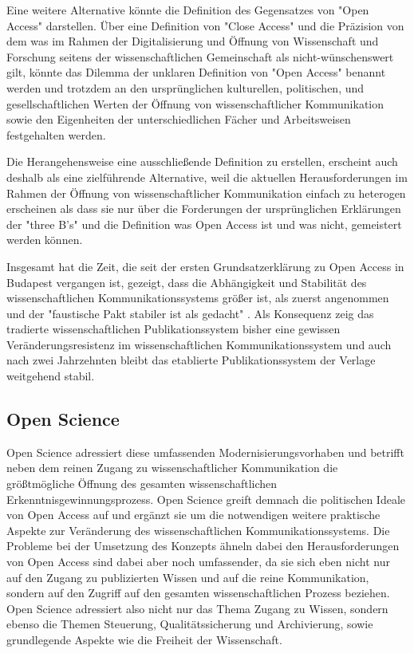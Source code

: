 Eine weitere Alternative könnte die Definition des Gegensatzes von "Open Access" darstellen. Über eine Definition von "Close Access" und die Präzision von dem was im Rahmen der Digitalisierung und Öffnung von Wissenschaft und Forschung seitens der wissenschaftlichen Gemeinschaft als nicht-wünschenswert gilt, könnte das Dilemma der unklaren Definition von "Open Access" benannt werden und trotzdem an den ursprünglichen kulturellen, politischen, und gesellschaftlichen Werten der Öffnung von wissenschaftlicher Kommunikation sowie den Eigenheiten der unterschiedlichen Fächer und Arbeitsweisen festgehalten werden.

Die Herangehensweise eine ausschließende Definition zu erstellen, erscheint auch deshalb als eine zielführende Alternative, weil die aktuellen Herausforderungen im Rahmen der Öffnung von wissenschaftlicher Kommunikation einfach zu heterogen erscheinen als dass sie nur über die Forderungen der ursprünglichen Erklärungen der "three B's" und die Definition was Open Access ist und was nicht, gemeistert werden können.

Insgesamt hat die Zeit, die seit der ersten Grundsatzerklärung zu Open Access in Budapest vergangen ist, gezeigt, dass die Abhängigkeit und Stabilität des wissenschaftlichen Kommunikationssystems größer ist, als zuerst angenommen und der "faustische Pakt stabiler ist als gedacht" \cite{hagner_2015_sache_buches}. Als Konsequenz zeig das tradierte wissenschaftlichen Publikationssystem bisher eine gewissen Veränderungsresistenz im wissenschaftlichen Kommunikationssystem und auch nach zwei Jahrzehnten bleibt das etablierte Publikationssystem der Verlage weitgehend stabil\cite{Hanekop_2014}.

\subsection{Open Science}

Open Science adressiert diese umfassenden Modernisierungsvorhaben und betrifft neben dem reinen Zugang zu wissenschaftlicher Kommunikation die größtmögliche Öffnung des gesamten wissenschaftlichen Erkenntnisgewinnungsprozess. Open Science greift demnach die politischen Ideale von Open Access auf und ergänzt sie um die notwendigen weitere praktische Aspekte zur Veränderung des wissenschaftlichen Kommunikationssystems. Die Probleme bei der Umsetzung des Konzepts ähneln dabei den Herausforderungen von Open Access sind dabei aber noch umfassender, da sie sich eben nicht nur auf den Zugang zu publizierten Wissen und auf die reine Kommunikation, sondern auf den Zugriff auf den gesamten wissenschaftlichen Prozess beziehen. Open Science adressiert also nicht nur das Thema Zugang zu Wissen, sondern ebenso die Themen Steuerung, Qualitätssicherung und Archivierung, sowie grundlegende Aspekte wie die Freiheit der Wissenschaft.


